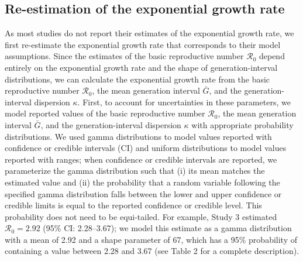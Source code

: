 \documentclass[12pt]{article}
\newcommand{\Ro}{\ensuremath{{\mathcal R}_{0}}\xspace}
\begin{document}
\subsection{Re-estimation of the exponential growth rate}

As most studies do not report their estimates of the exponential growth rate, we first re-estimate the exponential growth rate that corresponds to their model assumptions.
Since the estimates of the basic reproductive number \Ro depend entirely on the exponential growth rate and the shape of generation-interval distributions, we can calculate the exponential growth rate from the basic reproductive number \Ro, the mean generation interval $\bar G$, and the generation-interval dispersion $\kappa$.
First, to account for uncertainties in these parameters, we model reported values of the basic reproductive number \Ro, the mean generation interval $\bar G$, and the generation-interval dispersion $\kappa$ with appropriate probability distributions.
We used gamma distributions to model values reported with confidence or credible intervals (CI) and uniform distributions to model values reported with ranges;
when confidence or credible intervals are reported, we parameterize the gamma distribution such that (i) its mean matches the estimated value and (ii) the probability that a random variable following the specified gamma distribution falls between the lower and upper confidence or credible limits is equal to the reported confidence or credible level. 
This probability does not need to be equi-tailed.
For example, Study 3 estimated $\Ro = 2.92$ (95\% CI: 2.28--3.67);
we model this estimate as a gamma distribution with a mean of 2.92 and a shape parameter of 67, which has a 95\% probability of containing a value between 2.28 and 3.67 (see Table 2 for a complete description).
\end{document}
